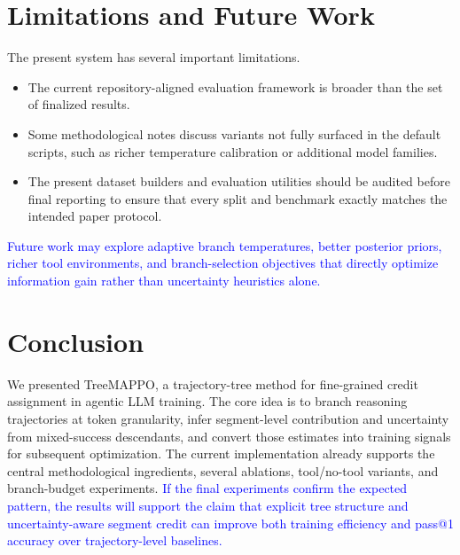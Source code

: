 \documentclass[letterpaper]{article} %
\newcommand{\ours}{TreeMAPPO}
\newcommand{\expected}[1]{\textcolor{blue}{#1}}
\begin{document}
\section{Limitations and Future Work}
The present system has several important limitations.
\begin{itemize}
    \item The current repository-aligned evaluation framework is broader than the set of finalized results.
    \item Some methodological notes discuss variants not fully surfaced in the default scripts, such as richer temperature calibration or additional model families.
    \item The present dataset builders and evaluation utilities should be audited before final reporting to ensure that every split and benchmark exactly matches the intended paper protocol.
\end{itemize}

\expected{Future work may explore adaptive branch temperatures, better posterior priors, richer tool environments, and branch-selection objectives that directly optimize information gain rather than uncertainty heuristics alone.}

\section{Conclusion}
We presented \ours, a trajectory-tree method for fine-grained credit assignment in agentic LLM training. The core idea is to branch reasoning trajectories at token granularity, infer segment-level contribution and uncertainty from mixed-success descendants, and convert those estimates into training signals for subsequent optimization. The current implementation already supports the central methodological ingredients, several ablations, tool/no-tool variants, and branch-budget experiments. \expected{If the final experiments confirm the expected pattern, the results will support the claim that explicit tree structure and uncertainty-aware segment credit can improve both training efficiency and pass@1 accuracy over trajectory-level baselines.}


\end{document}
